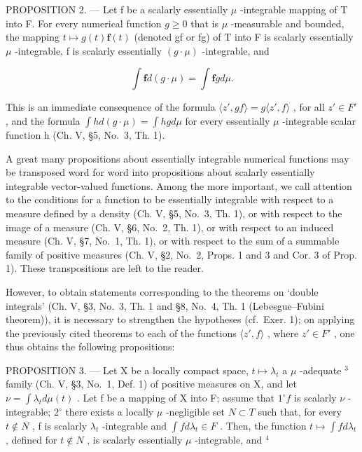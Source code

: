 PROPOSITION 2. --- Let f be a scalarly essentially \(\mu\) -integrable mapping of T into F. For every numerical function \(g \geqslant 0\) that is \(\mu\) -measurable and bounded, the mapping \(t \mapsto g(t)\mathbf{f}(t)\) (denoted gf or fg) of T into F is scalarly essentially \(\mu\) -integrable, f is scalarly essentially \((g \cdot \mu)\) -integrable, and

\[
\int \mathbf {f} d (g \cdot \mu) = \int \mathbf {f} g d \mu .
\]

This is an immediate consequence of the formula \(\langle z', gf\rangle = g\langle z', f\rangle\) , for all \(z' \in F'\) , and the formula \(\int h d(g \cdot \mu) = \int hg d\mu\) for every essentially \(\mu\) -integrable scalar function h (Ch. V, §5, No.~3, Th. 1).

A great many propositions about essentially integrable numerical functions may be transposed word for word into propositions about scalarly essentially integrable vector-valued functions. Among the more important, we call attention to the conditions for a function to be essentially integrable with respect to a measure defined by a density (Ch. V, §5, No.~3, Th. 1), or with respect to the image of a measure (Ch. V, §6, No.~2, Th. 1), or with respect to an induced measure (Ch. V, §7, No.~1, Th. 1), or with respect to the sum of a summable family of positive measures (Ch. V, §2, No.~2, Props. 1 and 3 and Cor. 3 of Prop. 1). These transpositions are left to the reader.

However, to obtain statements corresponding to the theorems on `double integrals' (Ch. V, §3, No.~3, Th. 1 and §8, No.~4, Th. 1 (Lebesgue--Fubini theorem)), it is necessary to strengthen the hypotheses (cf.~Exer. 1); on applying the previously cited theorems to each of the functions \(\langle z', f \rangle\) , where \(z' \in F'\) , one thus obtains the following propositions:

PROPOSITION 3. --- Let X be a locally compact space, \(t \mapsto \lambda_{t}\) a \(\mu\) -adequate \(^{3}\) family (Ch. V, §3, No.~1, Def. 1) of positive measures on X, and let \(\nu = \int \lambda_{t} d\mu(t)\) . Let f be a mapping of X into F; assume that \(1^{\circ} f\) is scalarly \(\nu\) -integrable; \(2^{\circ}\) there exists a locally \(\mu\) -negligible set \(N \subset T\) such that, for every \(t \notin N\) , f is scalarly \(\lambda_{t}\) -integrable and \(\int f d\lambda_{t} \in F\) . Then, the function \(t \mapsto \int f d\lambda_{t}\) , defined for \(t \notin N\) , is scalarly essentially \(\mu\) -integrable, and \(^{4}\)


